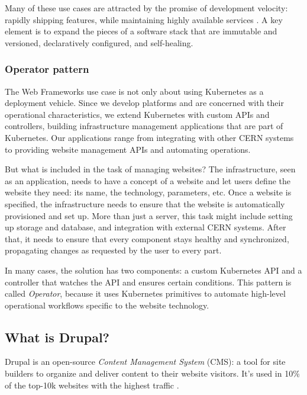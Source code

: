 Many of these use cases are attracted by the promise of development velocity:
rapidly shipping features, while maintaining highly available services \cite{hightower_kubernetes_2017}.
A key element is to expand the pieces of a software stack that are immutable and versioned, declaratively configured, and self-healing.

\subsubsection*{Operator pattern}
\label{sec-operators}

The Web Frameworks use case is not only about using Kubernetes as a deployment vehicle.
Since we develop platforms and are concerned with their operational characteristics,
we extend Kubernetes with custom APIs and controllers, building infrastructure management applications that are part of Kubernetes.
Our applications range from integrating with other CERN systems to providing website management APIs and automating operations.

But what is included in the task of managing websites?
The infrastructure, seen as an application, needs to have a concept of a website and let users define the website they need: its name, the technology, parameters, etc.
Once a website is specified, the infrastructure needs to ensure that the website is automatically provisioned and set up.
More than just a server, this task might include setting up storage and database, and integration with external CERN systems.
After that, it needs to ensure that every component stays healthy and synchronized, propagating changes as requested by the user to every part.

In many cases, the solution has two components: a custom Kubernetes API and a controller that watches the API and ensures certain conditions.
This pattern is called \emph{Operator}, because it uses Kubernetes primitives to automate high-level operational workflows specific to the website technology.

\subsection{What is Drupal?}
\label{what-is-drupal}

Drupal is an open-source \emph{Content Management System} (CMS): a tool for site builders to organize and deliver content to their website visitors.
It's used in 10\% of the top-10k websites with the highest traffic \cite{builtwith_pty_ltd_open_nodate,q-success_di_gelbmann_gmbh_wordpress_nodate}.

